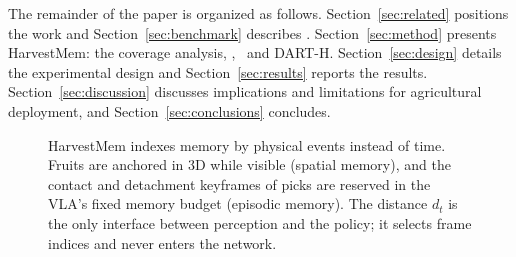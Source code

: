 The remainder of the paper is organized as follows. Section~\ref{sec:related} positions the work and Section~\ref{sec:benchmark} describes \bench. Section~\ref{sec:method} presents HarvestMem: the coverage analysis, \pekm, \fdm\ and DART-H. Section~\ref{sec:design} details the experimental design and Section~\ref{sec:results} reports the results. Section~\ref{sec:discussion} discusses implications and limitations for agricultural deployment, and Section~\ref{sec:conclusions} concludes.

\begin{figure}[t]
\centering
{}
\caption{HarvestMem indexes memory by physical events instead of time. Fruits are anchored in 3D while visible (spatial memory), and the contact and detachment keyframes of picks are reserved in the VLA's fixed memory budget (episodic memory). The distance $d_t$ is the only interface between perception and the policy; it selects frame indices and never enters the network.}
\label{fig:overview}
\end{figure}
